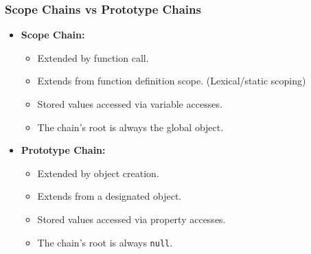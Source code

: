 \begin{frame}
    \frametitle{Scope Chains vs Prototype Chains}
    \begin{itemize}
        \item{\textbf{Scope Chain:}}
        \begin{itemize}
            \item{Extended by function call.}
            \item{Extends from function definition scope. (Lexical/static
                  scoping)}
            \item{Stored values accessed via variable accesses.}
            \item{The chain's root is always the global object.}
        \end{itemize}
        \item{\textbf{Prototype Chain:}}
        \begin{itemize}
            \item{Extended by object creation.}
            \item{Extends from a designated object.}
            \item{Stored values accessed via property accesses.}
            \item{The chain's root is always \texttt{null}.}
        \end{itemize}
    \end{itemize}
\end{frame}
